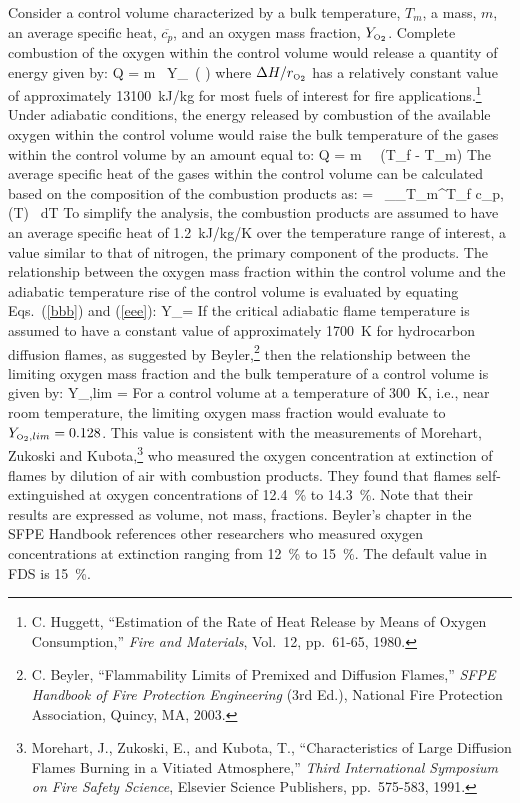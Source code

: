 Consider a control volume characterized
by a bulk temperature, $T_m$, a mass, $m$, an average specific heat, $\overline{c_p}$, and an oxygen mass
fraction, $Y_{\tiny \hbox{O}_2}$.  Complete combustion of the oxygen within the control volume would release a
quantity of energy given by:
\be
   Q = m \, Y_\OTWO \, \left(   \right)  \label{bbb}
\ee
where $\Delta H/r_{\tiny \hbox{O}_2}$ has a relatively constant value of
approximately 13100~kJ/kg for most fuels of interest for fire applications.\footnote{C. Huggett, ``Estimation of the Rate of Heat Release by Means of Oxygen
Consumption,'' {\em Fire and Materials}, Vol.~12, pp.~61-65, 1980.}
Under adiabatic conditions, the energy released by combustion of the available oxygen within
the control volume would raise the bulk temperature of the gases within the control volume by an
amount equal to:
\be
   Q = m \,  \, (T_f - T_m)  \label{eee}
\ee
The average specific heat of the gases within the control volume can be calculated based on the
composition of the combustion products as:
\be
    =  \, \sum_\alpha \int_{T_m}^{T_f} c_{p,\alpha} (T) \, dT
\ee
To simplify the analysis, the combustion products are assumed to have an average specific heat
of 1.2~kJ/kg/K over the temperature range of interest, a value similar to that of nitrogen, the primary
component of the products.
The relationship between the oxygen mass fraction within the control volume and the adiabatic
temperature rise of the control volume is evaluated by equating Eqs.~(\ref{bbb}) and (\ref{eee}):
\be
   Y_\OTWO = 
\ee
If the critical adiabatic flame temperature is assumed to have a constant value of approximately
1700~K for hydrocarbon diffusion flames, as suggested by Beyler,\footnote{C. Beyler, ``Flammability Limits of Premixed and Diffusion Flames,''
{\em SFPE Handbook of Fire Protection Engineering} (3rd Ed.), National Fire
Protection Association, Quincy, MA, 2003.} then the relationship
between the limiting oxygen mass fraction and the bulk temperature of a control volume is given
by:
\be
   Y_{\OTWO,lim} =  \approx  {}  \label{extinction_model}
\ee
For a control volume at a temperature of 300~K, i.e., near room temperature, the limiting oxygen
mass fraction would evaluate to $Y_{{\tiny \hbox{O}_2},lim}=0.128$.  This value is consistent with the measurements
of Morehart, Zukoski and Kubota,\footnote{Morehart, J., Zukoski, E., and Kubota, T., ``Characteristics of Large Diffusion Flames
Burning in a Vitiated Atmosphere,'' {\em Third International Symposium on Fire Safety
Science}, Elsevier Science Publishers, pp.~575-583, 1991.} who measured the oxygen concentration at extinction of flames by dilution of air
with combustion products. They found that flames self-extinguished at oxygen concentrations of 12.4~\% to 14.3~\%. Note that their results
are expressed as volume, not mass, fractions. Beyler's chapter in the SFPE Handbook references other researchers who measured oxygen
concentrations at extinction ranging from 12~\% to 15~\%. The default value in FDS is 15~\%.

